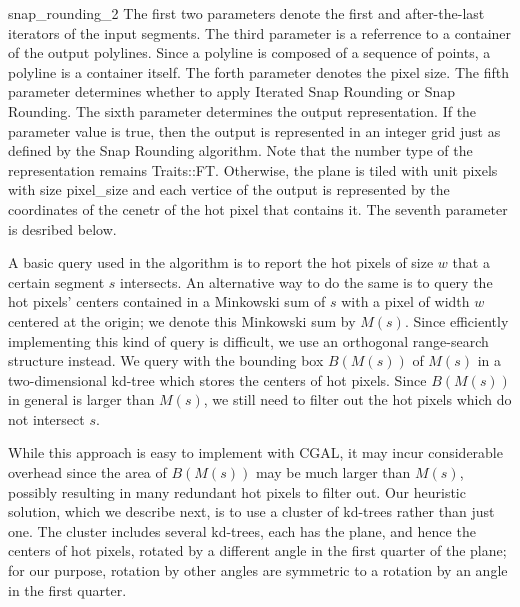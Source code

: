 \begin{ccRefFunction}{snap_rounding_2}
The first two parameters denote the first and after-the-last iterators of the input segments.
The third parameter is a referrence to a container of the output polylines. Since a polyline
is composed of a sequence of points, a polyline is a container itself.
The forth parameter denotes the pixel size. The fifth parameter determines whether to apply Iterated Snap Rounding
or Snap Rounding. The sixth parameter determines the output representation. If the
parameter value is {\ccc true}, then the output is represented in an integer
grid just as defined by the Snap Rounding algorithm. Note that the number type of
the representation remains {\ccc Traits::FT}. Otherwise, the plane is tiled
with unit pixels with size {\ccc pixel\_size} and each vertice of the output is
represented by the coordinates of the cenetr of the hot pixel that contains it.
The seventh parameter is desribed below.



\begin{ccAdvanced}

 A basic query used in the algorithm is to report the hot pixels of
 size $w$ that a certain segment $s$ intersects.  An alternative way to
 do the same is to query the hot pixels' centers contained in a
 Minkowski sum of $s$ with a pixel of width $w$ centered at the origin;
 we denote this Minkowski sum by $M(s)$. Since efficiently implementing
 this kind of query is difficult, we use an orthogonal range-search
 structure instead. We query with the bounding box $B(M(s))$ of $M(s)$
 in a two-dimensional kd-tree which stores the centers of hot
 pixels. Since $B(M(s))$ in general is larger than $M(s)$, we still
 need to filter out the hot pixels which do not intersect $s$.

 While this approach is easy to implement with CGAL, it may incur
 considerable overhead since the area of $B(M(s))$ may be much larger
 than $M(s)$, possibly resulting in many redundant hot pixels to filter
 out. Our heuristic solution, which we describe next, is to use a
 cluster of kd-trees rather than just one.  The cluster includes
 several kd-trees, each has the plane, and hence the centers of hot
 pixels, rotated by a different angle in the first quarter of the
 plane; for our purpose, rotation by other angles are symmetric to a
 rotation by an angle in the first quarter.


\end{ccAdvanced}
\end{ccRefFunction}
